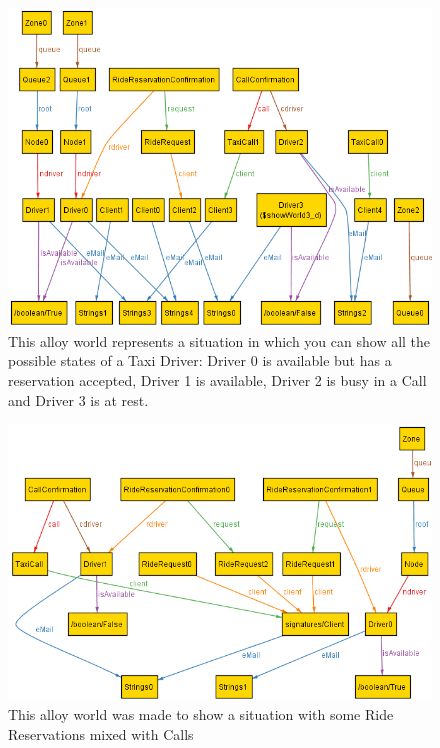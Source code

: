 \documentclass[a4paper]{article}
\begin{document}
\begin{figure}[H]
\includegraphics[width=\worldsWidth]{Alloy-FreeDriver}
\centering
\caption[Alloy World with a Taxi Driver in a rest]{This alloy world represents a situation in which you can show all the possible states of a Taxi Driver: Driver 0 is available but has a reservation accepted, Driver 1 is available, Driver 2 is busy in a Call and Driver 3 is at rest.
}
\label{fig:alloyworldfreedriver}
\end{figure}

\begin{figure}[H]
\includegraphics[width=\worldsWidth]{Alloy-RideReservation}
\centering
\caption[Alloy World with some Ride Reservations]{This alloy world was made to show a situation with some Ride Reservations mixed with Calls}
\label{fig:alloyworldridereservation}
\end{figure}
\end{document}
